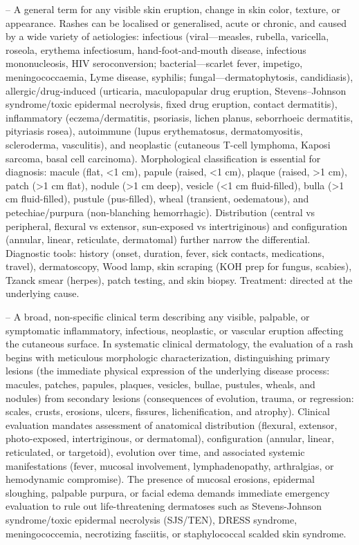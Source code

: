 -- A general term for any visible skin eruption, change in skin color, texture, or appearance. Rashes can be localised or generalised, acute or chronic, and caused by a wide variety of aetiologies: infectious (viral—measles, rubella, varicella, roseola, erythema infectiosum, hand-foot-and-mouth disease, infectious mononucleosis, HIV seroconversion; bacterial—scarlet fever, impetigo, meningococcaemia, Lyme disease, syphilis; fungal—dermatophytosis, candidiasis), allergic/drug-induced (urticaria, maculopapular drug eruption, Stevens–Johnson syndrome/toxic epidermal necrolysis, fixed drug eruption, contact dermatitis), inflammatory (eczema/dermatitis, psoriasis, lichen planus, seborrhoeic dermatitis, pityriasis rosea), autoimmune (lupus erythematosus, dermatomyositis, scleroderma, vasculitis), and neoplastic (cutaneous T-cell lymphoma, Kaposi sarcoma, basal cell carcinoma). Morphological classification is essential for diagnosis: macule (flat, <1 cm), papule (raised, <1 cm), plaque (raised, >1 cm), patch (>1 cm flat), nodule (>1 cm deep), vesicle (<1 cm fluid-filled), bulla (>1 cm fluid-filled), pustule (pus-filled), wheal (transient, oedematous), and petechiae/purpura (non-blanching hemorrhagic). Distribution (central vs peripheral, flexural vs extensor, sun-exposed vs intertriginous) and configuration (annular, linear, reticulate, dermatomal) further narrow the differential. Diagnostic tools: history (onset, duration, fever, sick contacts, medications, travel), dermatoscopy, Wood lamp, skin scraping (KOH prep for fungus, scabies), Tzanck smear (herpes), patch testing, and skin biopsy. Treatment: directed at the underlying cause.

-- A broad, non-specific clinical term describing any visible, palpable, or symptomatic inflammatory, infectious, neoplastic, or vascular eruption affecting the cutaneous surface. In systematic clinical dermatology, the evaluation of a rash begins with meticulous morphologic characterization, distinguishing primary lesions (the immediate physical expression of the underlying disease process: macules, patches, papules, plaques, vesicles, bullae, pustules, wheals, and nodules) from secondary lesions (consequences of evolution, trauma, or regression: scales, crusts, erosions, ulcers, fissures, lichenification, and atrophy). Clinical evaluation mandates assessment of anatomical distribution (flexural, extensor, photo-exposed, intertriginous, or dermatomal), configuration (annular, linear, reticulated, or targetoid), evolution over time, and associated systemic manifestations (fever, mucosal involvement, lymphadenopathy, arthralgias, or hemodynamic compromise). The presence of mucosal erosions, epidermal sloughing, palpable purpura, or facial edema demands immediate emergency evaluation to rule out life-threatening dermatoses such as Stevens-Johnson syndrome/toxic epidermal necrolysis (SJS/TEN), DRESS syndrome, meningococcemia, necrotizing fasciitis, or staphylococcal scalded skin syndrome.

